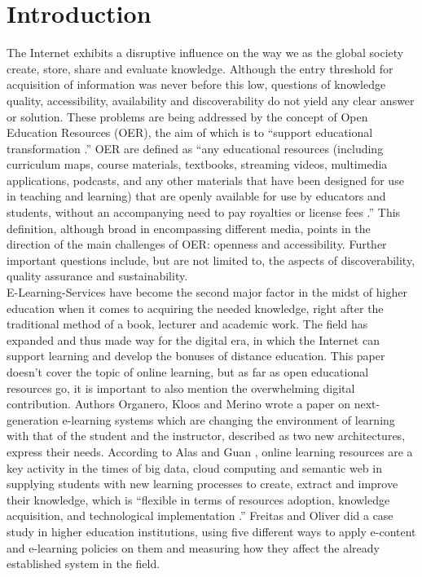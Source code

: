 \documentclass[a4paper]{article}
\begin{document}
\newpage 
\tableofcontents 
\newpage 

\section{Introduction}
The Internet exhibits a disruptive influence on the way we as the global society create, store, share and evaluate knowledge. Although the entry threshold for acquisition of information was never before this low, questions of knowledge quality, accessibility, availability and discoverability do not yield any clear answer or solution. These problems are being addressed by the concept of Open Education Resources (OER), the aim of which is to ``support educational transformation \cite{basicguide}.'' OER are defined as ``any educational resources (including curriculum maps, course materials, textbooks, streaming videos, multimedia applications, podcasts, and any other materials that have been designed for use in teaching and learning) that are openly available for use by educators and students, without an accompanying need to pay royalties or license fees \cite{basicguide}.'' This definition, although broad in encompassing different media, points in the direction of the main challenges of OER: openness and accessibility. Further important questions include, but are not limited to, the aspects of discoverability, quality assurance and sustainability.\\

\noindent
E-Learning-Services have become the second major factor in the midst of higher education when it comes to acquiring the needed knowledge, right after the traditional method of a book, lecturer and academic work. The field has expanded and thus made way for the digital era, in which the Internet can support learning and develop the bonuses of distance education. This paper doesn't cover the topic of online learning, but as far as open educational resources go, it is important to also mention the overwhelming digital contribution. Authors Organero, Kloos and Merino \cite{el-1} wrote a paper on next-generation e-learning systems which are changing the environment of learning with that of the student and the instructor, described as two new architectures, express their needs. According to Alas and Guan \cite{el-2}, online learning resources are a key activity in the times of big data, cloud computing and semantic web in supplying students with new learning processes to create, extract and improve their knowledge, which is ``flexible in terms of resources adoption, knowledge acquisition, and technological implementation \cite{el-2}.'' Freitas and Oliver \cite{el-3} did a case study in higher education institutions, using five different ways to apply e-content and e-learning policies on them and measuring how they affect the already established system in the field. \\
\end{document}
